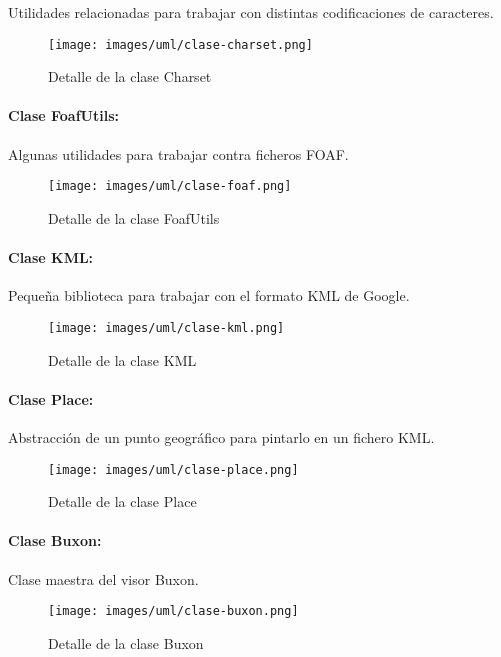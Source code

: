 Utilidades relacionadas para trabajar con distintas codificaciones de caracteres.

\begin{figure}[H]
	\centering
 	\texttt{[image: images/uml/clase-charset.png]}
	\caption{Detalle de la clase Charset}
	\label{fig:uml:charset-class}
\end{figure}

\paragraph{Clase FoafUtils:}

Algunas utilidades para trabajar contra ficheros FOAF.

\begin{figure}[H]
	\centering
 	\texttt{[image: images/uml/clase-foaf.png]}
	\caption{Detalle de la clase FoafUtils}
	\label{fig:uml:foafutils-class}
\end{figure}

\paragraph{Clase KML:}

Pequeña biblioteca para trabajar con el formato KML de Google.

\begin{figure}[H]
	\centering
 	\texttt{[image: images/uml/clase-kml.png]}
	\caption{Detalle de la clase KML}
	\label{fig:uml:kml-class}
\end{figure}

\paragraph{Clase Place:}

Abstracción de un punto geográfico para pintarlo en un fichero KML.

\begin{figure}[H]
	\centering
 	\texttt{[image: images/uml/clase-place.png]}
	\caption{Detalle de la clase Place}
	\label{fig:uml:place-class}
\end{figure}

\paragraph{Clase Buxon:}

Clase maestra del visor Buxon.

\begin{figure}[H]
	\centering
 	\texttt{[image: images/uml/clase-buxon.png]}
	\caption{Detalle de la clase Buxon}
	\label{fig:uml:buxon-class}
\end{figure}

